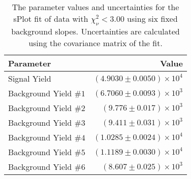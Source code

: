 
\begin{table}[ht]
    \begin{center}
        \begin{tabular}{lr}\toprule
            Parameter & Value \\\midrule
            Signal Yield & $(4.9030 \pm 0.0050) \times 10^{4}$ \\
            Background Yield $\#1$ & $(6.7060 \pm 0.0093) \times 10^{3}$ \\
            Background Yield $\#2$ & $(9.776 \pm 0.017) \times 10^{3}$ \\
            Background Yield $\#3$ & $(9.411 \pm 0.031) \times 10^{3}$ \\
            Background Yield $\#4$ & $(1.0285 \pm 0.0024) \times 10^{4}$ \\
            Background Yield $\#5$ & $(1.1189 \pm 0.0030) \times 10^{4}$ \\
            Background Yield $\#6$ & $(8.607 \pm 0.025) \times 10^{3}$ \\\bottomrule
        \end{tabular}
        \caption{The parameter values and uncertainties for the sPlot fit of data with $\chi^2_\nu < 3.00$ using six fixed background slopes. Uncertainties are calculated using the covariance matrix of the fit.}\label{tab:splot-fit-results-chisqdof-3.00-fixed-6}
    \end{center}
\end{table}
